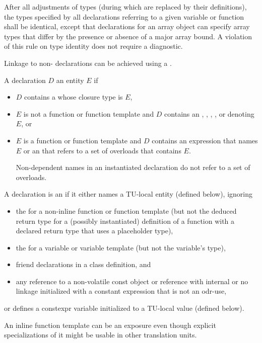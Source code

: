 \pnum
{}%
%
After all adjustments of types (during which
 are replaced by their definitions), the
types specified by all declarations referring to a given variable or
function shall be identical, except that declarations for an array
object can specify array types that differ by the presence or absence of
a major array bound. A violation of this rule on type
identity does not require a diagnostic.

\pnum
\begin{note}
Linkage to non-\Cpp{} declarations can be achieved using a
.
\end{note}

\pnum
A declaration $D$  an entity $E$ if
\begin{itemize}
\item
$D$ contains a  whose closure type is $E$,
\item
$E$ is not a function or function template and $D$ contains an
,
,
,
, or
denoting $E$, or
\item
$E$ is a function or function template and
$D$ contains an expression that names $E$ or
an 
that refers to a set of overloads that contains $E$.
\begin{note}
Non-dependent names in an instantiated declaration
do not refer to a set of overloads.
\end{note}
\end{itemize}

\pnum
A declaration is an 
if it either names a TU-local entity (defined below), ignoring
\begin{itemize}
\item
the 
for a non-inline function or function template
(but not the deduced return type
for a (possibly instantiated) definition of a function
with a declared return type that uses a placeholder type),
\item
the 
for a variable or variable template (but not the variable's type),
\item
friend declarations in a class definition, and
\item
any reference to a non-volatile const object or reference
with internal or no linkage initialized with a constant expression
that is not an odr-use,
\end{itemize}
or defines a constexpr variable initialized to a TU-local value (defined below).
\begin{note}
An inline function template can be an exposure even though
explicit specializations of it might be usable in other translation units.
\end{note}

